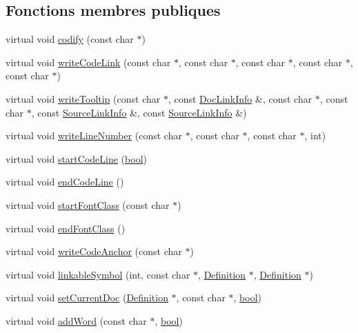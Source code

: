 \subsection*{Fonctions membres publiques}
\begin{DoxyCompactItemize}
\item 
virtual void \hyperlink{class_dev_null_code_doc_interface_a75e60fd56c45e70af39b3b926e76d53f}{codify} (const char $\ast$)
\item 
virtual void \hyperlink{class_dev_null_code_doc_interface_a44ad7fe7fba94cb200fd0d53642b1909}{write\+Code\+Link} (const char $\ast$, const char $\ast$, const char $\ast$, const char $\ast$, const char $\ast$)
\item 
virtual void \hyperlink{class_dev_null_code_doc_interface_a3f251d7e2651aa943adf84c35e27d094}{write\+Tooltip} (const char $\ast$, const \hyperlink{struct_doc_link_info}{Doc\+Link\+Info} \&, const char $\ast$, const char $\ast$, const \hyperlink{struct_source_link_info}{Source\+Link\+Info} \&, const \hyperlink{struct_source_link_info}{Source\+Link\+Info} \&)
\item 
virtual void \hyperlink{class_dev_null_code_doc_interface_a32188c740a455bab278f9098212b8fec}{write\+Line\+Number} (const char $\ast$, const char $\ast$, const char $\ast$, int)
\item 
virtual void \hyperlink{class_dev_null_code_doc_interface_a3a63c468ba7f134f5f5cfc5867a81e3a}{start\+Code\+Line} (\hyperlink{qglobal_8h_a1062901a7428fdd9c7f180f5e01ea056}{bool})
\item 
virtual void \hyperlink{class_dev_null_code_doc_interface_a5aeb9fdbb29f60058c55adecefab457a}{end\+Code\+Line} ()
\item 
virtual void \hyperlink{class_dev_null_code_doc_interface_a8489329a11f50e9d9ab1a3a67d306a51}{start\+Font\+Class} (const char $\ast$)
\item 
virtual void \hyperlink{class_dev_null_code_doc_interface_adb2939da13563e88a225059de3d767e5}{end\+Font\+Class} ()
\item 
virtual void \hyperlink{class_dev_null_code_doc_interface_abfa6f09f69831c231f0fe7bb095b8fc4}{write\+Code\+Anchor} (const char $\ast$)
\item 
virtual void \hyperlink{class_dev_null_code_doc_interface_a1d33f0e7e7ef04490c9c5f4feb0f89dd}{linkable\+Symbol} (int, const char $\ast$, \hyperlink{class_definition}{Definition} $\ast$, \hyperlink{class_definition}{Definition} $\ast$)
\item 
virtual void \hyperlink{class_dev_null_code_doc_interface_aef9f575fa448694b1354e213634f3e95}{set\+Current\+Doc} (\hyperlink{class_definition}{Definition} $\ast$, const char $\ast$, \hyperlink{qglobal_8h_a1062901a7428fdd9c7f180f5e01ea056}{bool})
\item 
virtual void \hyperlink{class_dev_null_code_doc_interface_a8ea71442357b2793532f7bab3a9f6319}{add\+Word} (const char $\ast$, \hyperlink{qglobal_8h_a1062901a7428fdd9c7f180f5e01ea056}{bool})
\end{DoxyCompactItemize}


